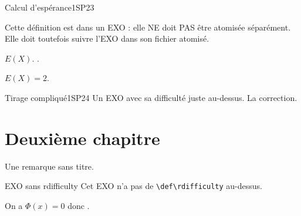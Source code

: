 \def\rdifficulty{1}
\begin{EXO}{Calcul d'espérance}{1SP23}
\begin{Definition}
Cette définition est dans un EXO : elle NE doit PAS être atomisée séparément.
Elle doit toutefois suivre l'EXO dans son fichier atomisé.
\end{Definition}

\begin{tcbenumerate}[2]
    \tcbitem {} $E(X)$.
    \tcbitem {}.
\end{tcbenumerate}

\exocorrection

$E(X) = 2$.
\end{EXO}

\def\rdifficulty{2.5}
\begin{EXO}{Tirage compliqué}{1SP24}
Un EXO avec sa difficulté juste au-dessus.
\exocorrection
La correction.
\end{EXO}

\section{Deuxième chapitre}



\begin{Remarque}
Une remarque sans titre.
\end{Remarque}

\begin{EXO}{EXO sans rdifficulty}{}
Cet EXO n'a pas de \verb|\def\rdifficulty| au-dessus.
\end{EXO}

\begin{Demonstration}[Cas n°2]
On a $\Phi(x) = 0$ donc .
\end{Demonstration}
